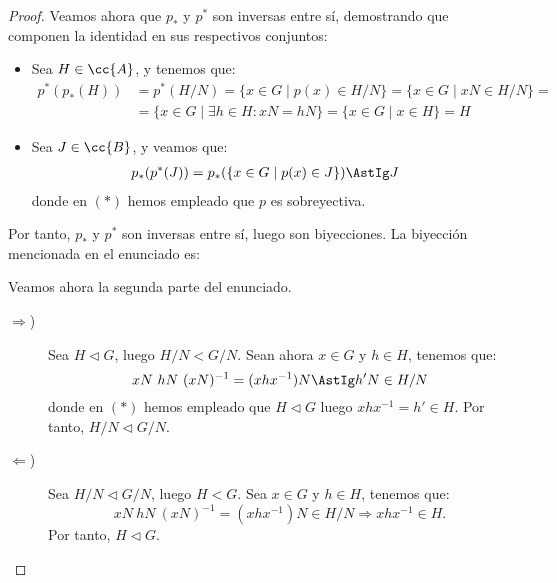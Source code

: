 \begin{ejercicio}
\begin{teo}
\begin{proof}
            Veamos ahora que \(p_\ast\) y \(p^\ast\) son inversas entre sí, demostrando que componen la identidad en sus respectivos conjuntos:
            \begin{itemize}
                \item Sea \(H\in \cc{A}\), y tenemos que:
                \begin{align*}
                    p^\ast(p_\ast(H)) &= p^\ast(H/N) = \{x\in G \mid p(x) \in H/N\} = \{x\in G \mid xN \in H/N\}
                    =\\&= \{x\in G \mid \exists h\in H: xN = hN\}
                    = \{x\in G \mid x \in H\} = H
                \end{align*}

                \item Sea \(J\in \cc{B}\), y veamos que:
                \begin{align*}
                    p_\ast(p^\ast(J)) &= p_\ast(\{x\in G \mid p(x) \in J\}) \AstIg J
                \end{align*}
                donde en $(\ast)$ hemos empleado que \(p\) es sobreyectiva.
            \end{itemize}

            Por tanto, \(p_\ast\) y \(p^\ast\) son inversas entre sí, luego son biyecciones. La biyección mencionada en el enunciado es:

            Veamos ahora la segunda parte del enunciado.
            \begin{description}
                \item[$\Longrightarrow$)] Sea \(H\lhd G\), luego \(H/N < G/N\). Sean ahora \(x\in G\) y \(h\in H\), tenemos que:
                \begin{equation*}
                    xN\ hN\ (xN)^{-1} = (xhx^{-1})N \AstIg h'N\in H/N
                \end{equation*}
                donde en \((\ast)\) hemos empleado que \(H\lhd G\) luego \(xhx^{-1}=h'\in H\). Por tanto, \(H/N\lhd G/N\).

                \item[$\Longleftarrow$)] Sea \(H/N\lhd G/N\), luego \(H < G\). Sea \(x\in G\) y \(h\in H\), tenemos que:
                \begin{equation*}
                    xN\ hN\ (xN)^{-1} = (xhx^{-1})N \in H/N
                    \Longrightarrow
                    xhx^{-1} \in H.
                \end{equation*}
                Por tanto, \(H\lhd G\).
            \end{description}


\end{proof}
\end{teo}
\end{ejercicio}
